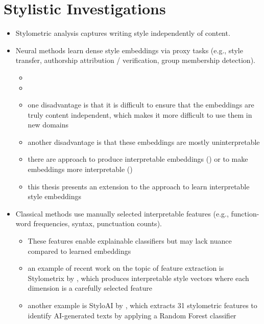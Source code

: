 \section{Stylistic Investigations}
\label{sec:background:styleInvestigations}
\begin{itemize}
  \item Stylometric analysis captures writing style independently of content.
  \item Neural methods learn dense style embeddings via proxy tasks (e.g., style transfer, authorship attribution / verification, group membership detection).
        \begin{itemize}
          \item %
          \item %
          \item one disadvantage is that it is difficult to ensure that the embeddings are truly content independent, which makes it more difficult to use them in new domains %
          \item another disadvantage is that these embeddings are mostly uninterpretable
          \item there are approach to produce interpretable embeddings (\cite{patelLearningInterpretableStyle2023}) or to make embeddings more interpretable (\cite{alshomaryLatentSpaceInterpretation2024})
          \item this thesis presents an extension to the approach to learn interpretable style embeddings
        \end{itemize}
  \item Classical methods use manually selected interpretable features (e.g., function-word frequencies, syntax, punctuation counts). %
        \begin{itemize}
          \item These features enable explainable classifiers but may lack nuance compared to learned embeddings
          \item an example of recent work on the topic of feature extraction is Stylometrix by \citet{okulskaStyloMetrixOpensourceMultilingual2023}, which produces interpretable style vectors where each dimension is a carefully selected feature
          \item another example is StyloAI by \citet{oparaStyloAIDistinguishingAIgenerated2024a}, which extracts \num{31} stylometric features to identify AI-generated texts by applying a Random Forest classifier

\end{itemize}
\end{itemize}
